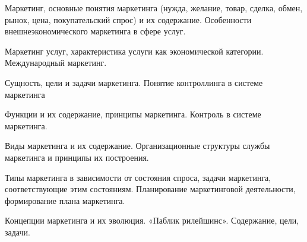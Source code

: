 \documentclass[
	14pt,
	a4paper,
	]
	{scrartcl}
\begin{document}
\shapk
{}
\setcounter{zad}{0}

\vfill
\z Маркетинг, основные понятия маркетинга (нужда, желание, товар, сделка, обмен, рынок, цена, покупательский спрос) и их содержание.
 \vfill
\z Особенности внешнеэкономического маркетинга в сфере услуг. \vfill

\vfill

\newpage


\shapk
{}
\setcounter{zad}{0}

\vfill
\z Маркетинг услуг, характеристика услуги как экономической категории.
 \vfill
\z Международный маркетинг.
 \vfill

\vfill

\newpage


\shapk
{}
\setcounter{zad}{0}

\vfill
\z Сущность, цели и задачи маркетинга.
 \vfill
\z Понятие контроллинга в системе маркетинга
 \vfill

\vfill

\newpage


\shapk
{}
\setcounter{zad}{0}

\vfill
\z Функции и их содержание, принципы маркетинга.
 \vfill
\z Контроль в системе маркетинга.
 \vfill

\vfill

\newpage


\shapk
{}
\setcounter{zad}{0}

\vfill
\z Виды маркетинга и их содержание.
 \vfill
\z Организационные структуры службы маркетинга и принципы их построения.
 \vfill

\vfill

\newpage


\shapk
{}
\setcounter{zad}{0}

\vfill
\z Типы маркетинга в зависимости от состояния спроса, задачи маркетинга, соответствующие этим состояниям.
 \vfill
\z Планирование маркетинговой деятельности, формирование плана маркетинга.
 \vfill

\vfill

\newpage


\shapk
{}
\setcounter{zad}{0}

\vfill
\z Концепции маркетинга и их эволюция.
 \vfill
\z «Паблик рилейшинс». Содержание, цели, задачи.
 \vfill

\vfill
\end{document}
